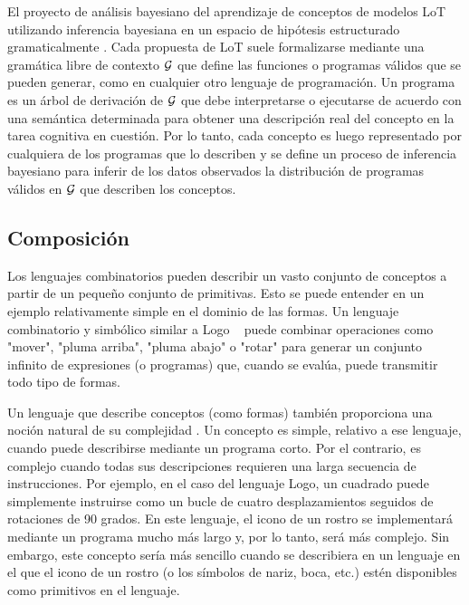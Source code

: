 El proyecto de análisis bayesiano del aprendizaje de conceptos de modelos LoT utilizando inferencia bayesiana en un espacio de hipótesis estructurado gramaticalmente \cite{goodman2008rational}. Cada propuesta de LoT suele formalizarse mediante una gramática libre de contexto $ \gram $ que define las funciones o programas válidos que se pueden generar, como en cualquier otro lenguaje de programación. Un programa es un árbol de derivación de $ \gram $ que debe interpretarse o ejecutarse de acuerdo con una semántica determinada para obtener una descripción real del concepto en la tarea cognitiva en cuestión. Por lo tanto, cada concepto es luego representado por cualquiera de los programas que lo describen y se define un proceso de inferencia bayesiano para inferir de los datos observados la distribución de programas válidos en $ \gram $ que describen los conceptos.

\subsection{Composición}
Los lenguajes combinatorios pueden describir un vasto conjunto de conceptos a partir de un pequeño conjunto de primitivas. Esto se puede entender en un ejemplo relativamente simple en el dominio de las formas. Un lenguaje combinatorio y simbólico similar a Logo ~\cite{abelson1974logo} puede combinar operaciones como "mover", "pluma arriba", "pluma abajo" o "rotar" para generar un conjunto infinito de expresiones (o programas) que, cuando se evalúa, puede transmitir todo tipo de formas.

Un lenguaje que describe conceptos (como formas) también proporciona una noción natural de su complejidad \cite{kolmogorov1968three}. Un concepto es simple, relativo a ese lenguaje, cuando puede describirse mediante un programa corto. Por el contrario, es complejo cuando todas sus descripciones requieren una larga secuencia de instrucciones. Por ejemplo, en el caso del lenguaje Logo, un cuadrado puede simplemente instruirse como un bucle de cuatro desplazamientos seguidos de rotaciones de 90 grados. En este lenguaje, el icono de un rostro se implementará mediante un programa mucho más largo y, por lo tanto, será más complejo. Sin embargo, este concepto sería más sencillo cuando se describiera en un lenguaje en el que el icono de un rostro (o los símbolos de nariz, boca, etc.) estén disponibles como primitivos en el lenguaje.

